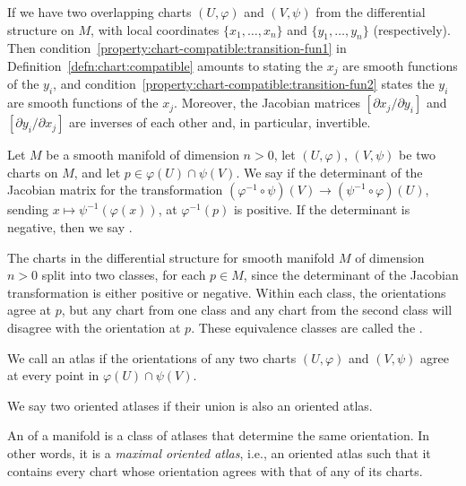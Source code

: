 If we have two overlapping charts $(U,\varphi)$ and $(V,\psi)$ from the
differential structure on $M$, with local coordinates $\{x_{1},\dots,x_{n}\}$
and $\{y_{1},\dots,y_{n}\}$ (respectively). Then
condition~\ref{property:chart-compatible:transition-fun1} in
Definition~\ref{defn:chart:compatible} amounts to stating
the $x_{j}$ are smooth functions of the $y_{i}$, and
condition~\ref{property:chart-compatible:transition-fun2} states
the $y_{i}$ are smooth functions of the $x_{j}$.
Moreover, the Jacobian matrices $[\partial x_{j}/\partial y_{i}]$
and $[\partial y_{i}/\partial x_{j}]$ are inverses of each other and, in
particular, invertible.

\begin{definition}
Let $M$ be a smooth manifold of dimension $n>0$,
let $(U,\varphi)$, $(V,\psi)$ be two charts on $M$,
and let $p\in\varphi(U)\cap\psi(V)$.
We say  if
the determinant of the Jacobian matrix for the transformation
$(\varphi^{-1}\circ\psi)(V)\to(\psi^{-1}\circ\varphi)(U)$,
sending $x\mapsto\psi^{-1}(\varphi(x))$, at $\varphi^{-1}(p)$ is positive.
If the determinant is negative, then we say 
.
\end{definition}

\begin{definition}
The charts in the differential structure for smooth manifold $M$ of
dimension $n>0$ split into two classes, for each $p\in M$, since the
determinant of the Jacobian transformation is either positive or negative.
Within each class, the orientations agree at $p$, but any chart from one
class and any chart from the second class will disagree with the orientation 
at $p$. These equivalence classes are called the .
\end{definition}

\begin{definition}
We call an atlas  if the orientations of any two charts
$(U,\varphi)$ and $(V,\psi)$ agree at every point in $\varphi(U)\cap\psi(V)$.
\end{definition}

\begin{definition}
We say two oriented atlases  if their
union is also an oriented atlas.
\end{definition}

\begin{definition}
An  of a manifold is a class of atlases that
determine the same orientation. In other words, it is a \emph{maximal oriented atlas},
i.e., an oriented atlas such that it contains every chart whose
orientation agrees with that of any of its charts.
\end{definition}

